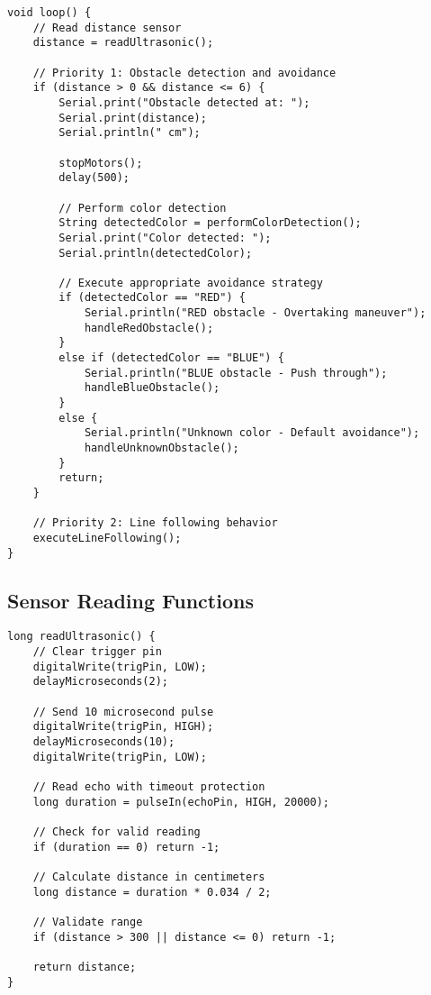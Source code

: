 \documentclass[12pt,a4paper]{article}
\begin{document}
\begin{lstlisting}[caption={Main Control Loop}, label={lst:main}]
void loop() {
    // Read distance sensor
    distance = readUltrasonic();
    
    // Priority 1: Obstacle detection and avoidance
    if (distance > 0 && distance <= 6) {
        Serial.print("Obstacle detected at: ");
        Serial.print(distance);
        Serial.println(" cm");
        
        stopMotors();
        delay(500);
        
        // Perform color detection
        String detectedColor = performColorDetection();
        Serial.print("Color detected: ");
        Serial.println(detectedColor);
        
        // Execute appropriate avoidance strategy
        if (detectedColor == "RED") {
            Serial.println("RED obstacle - Overtaking maneuver");
            handleRedObstacle();
        }
        else if (detectedColor == "BLUE") {
            Serial.println("BLUE obstacle - Push through");
            handleBlueObstacle();
        }
        else {
            Serial.println("Unknown color - Default avoidance");
            handleUnknownObstacle();
        }
        return;
    }
    
    // Priority 2: Line following behavior
    executeLineFollowing();
}
\end{lstlisting}

\subsection{Sensor Reading Functions}

\begin{lstlisting}[caption={Ultrasonic Distance Measurement}, label={lst:ultrasonic}]
long readUltrasonic() {
    // Clear trigger pin
    digitalWrite(trigPin, LOW);
    delayMicroseconds(2);
    
    // Send 10 microsecond pulse
    digitalWrite(trigPin, HIGH);
    delayMicroseconds(10);
    digitalWrite(trigPin, LOW);
    
    // Read echo with timeout protection
    long duration = pulseIn(echoPin, HIGH, 20000);
    
    // Check for valid reading
    if (duration == 0) return -1;
    
    // Calculate distance in centimeters
    long distance = duration * 0.034 / 2;
    
    // Validate range
    if (distance > 300 || distance <= 0) return -1;
    
    return distance;
}
\end{lstlisting}
\end{document}
